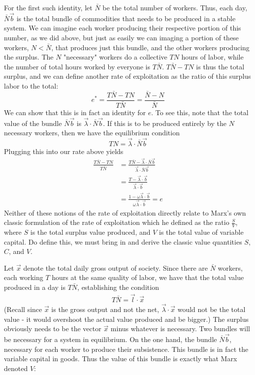 For the first such identity, let $\bar{N}$ be the total number of workers. Thus, each day, $\bar{N}\vec{b}$ is the total bundle of commodities that needs to be produced in a stable system. We can imagine each worker producing their respective portion of this number, as we did above, but just as easily we can imaging a portion of these workers, $N < \bar{N}$, that produces just this bundle, and the other workers producing the surplus. The $N$ "necessary" workers do a collective $TN$ hours of labor, while the number of total hours worked by everyone is $T\bar{N}$. $T\bar{N} - TN$ is thus the total surplus, and we can define another rate of exploitation as the ratio of this surplus labor to the total:
\[ e^* = \frac{T\bar{N} - TN}{T\bar{N}} = \frac{\bar{N} - N}{\bar{N}} \]
We can show that this is in fact an identity for $e$. To see this, note that the total value of the bundle $\bar{N}\vec{b}$ is $\vec{\lambda} \cdot \bar{N}\vec{b}$. If this is to be produced entirely by the $N$ necessary workers, then we have the equilibrium condition
\[ TN = \vec{\lambda} \cdot \bar{N}\vec{b} \]
Plugging this into our rate above yields
\begin{align*}
	 \frac{T\bar{N} - TN}{T\bar{N}} &=  \frac{T\bar{N} - \vec{\lambda} \cdot \bar{N}\vec{b}}{\vec{\lambda} \cdot \bar{N}\vec{b}} \\
	 &= \frac{T - \vec{\lambda} \cdot \vec{b}}{\vec{\lambda} \cdot \vec{b}} \\
	 &= \frac{1 - \omega \vec{\lambda} \cdot \vec{b}}{\omega\vec{\lambda}\cdot \vec{b}} = e
\end{align*}
Neither of these notions of the rate of exploitation directly relate to Marx's own classic formulation of the rate of exploitation which he defined as the ratio $\frac{S}{V}$, where $S$ is the total surplus value produced, and $V$ is the total value of variable capital. Do define this, we must bring in and derive the classic value quantities $S$, $C$, and $V$. \par 
Let $\vec{x}$ denote the total daily gross output of society. Since there are $\bar{N}$ workers, each working $T$ hours at the same quality of labor, we have that the total value produced in a day is $T\bar{N}$, establishing the condition
\begin{align}
	T\bar{N} = \vec{l}\cdot \vec{x}
\end{align}
(Recall since $\vec{x}$ is the gross output and not the net, $\vec{\lambda}\cdot \vec{x}$ would not be the total value - it would overshoot the actual value produced and be bigger.)
The surplus obviously needs to be the vector $\vec{x}$ minus whatever is necessary. Two bundles will be necessary for a system in equilibrium. On the one hand, the bundle $\bar{N}\vec{b}$, necessary for each worker to produce their subsistence. This bundle is in fact the variable capital in goods. Thus the value of this bundle is exactly what Marx denoted $V$:
